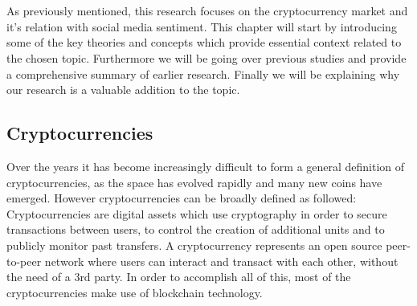 \chapter{}%
\label{ch:stand-van-zaken}


As previously mentioned, this research focuses on the cryptocurrency market and it's relation with social media sentiment. This chapter will start by introducing some of the key theories and concepts which provide essential context related to the chosen topic.
Furthermore we will be going over previous studies and provide a comprehensive summary of earlier research. Finally we will be explaining why our research is a valuable addition to the topic.





\section{Cryptocurrencies }%
\label{introductie}
Over the years it has become increasingly difficult to form a general definition of cryptocurrencies, as the space has evolved rapidly and many new coins have emerged. However cryptocurrencies can be broadly defined as followed: \bigbreak
Cryptocurrencies are digital assets which use cryptography in order to secure transactions between users, to control the creation of additional units and to publicly monitor past transfers. A cryptocurrency represents an open source peer-to-peer network where users can interact and transact with each other, without the need of a 3rd party. In order to accomplish all of this, most of the cryptocurrencies make use of blockchain technology.~\autocite{Wolfgang2019} \bigbreak

